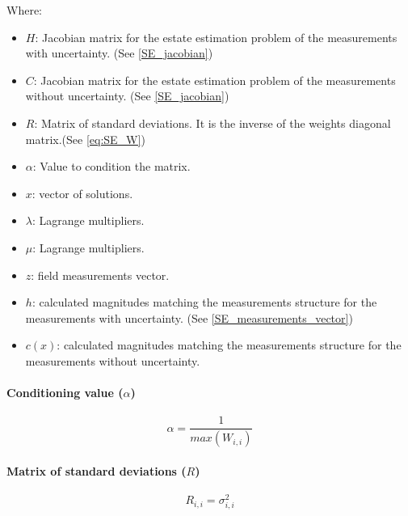 \documentclass[nols,a4paper,twoside,notoc,fleqn]{tufte-book}
\begin{document}
Where:

\begin{itemize}
	\item $H$: Jacobian matrix for the estate estimation problem of the measurements with uncertainty. (See \ref{SE_jacobian})
	\item $C$: Jacobian matrix for the estate estimation problem of the measurements without uncertainty. (See \ref{SE_jacobian})
	\item $R$: Matrix of standard deviations. It is the inverse of the weights diagonal matrix.(See \ref{eq:SE_W})
	\item $\alpha$: Value to condition the matrix. 
	\item $x$: vector of solutions.
	\item $\lambda$: Lagrange multipliers.
	\item $\mu$: Lagrange multipliers.
	\item $z$: field measurements vector.
	\item $h$: calculated magnitudes matching the measurements structure for the measurements with uncertainty. (See \ref{SE_measurements_vector})
	\item $c(x)$: calculated magnitudes matching the measurements structure for the measurements without uncertainty.
\end{itemize}


\paragraph{Conditioning value ($\alpha$)}

\begin{equation}
\alpha = \frac{1}{max(W_{i, i})}
\end{equation}


\paragraph{Matrix of standard deviations ($R$)}

\begin{equation}
R_{i, i} = \sigma_{i, i}^2
\end{equation}


\end{document}
